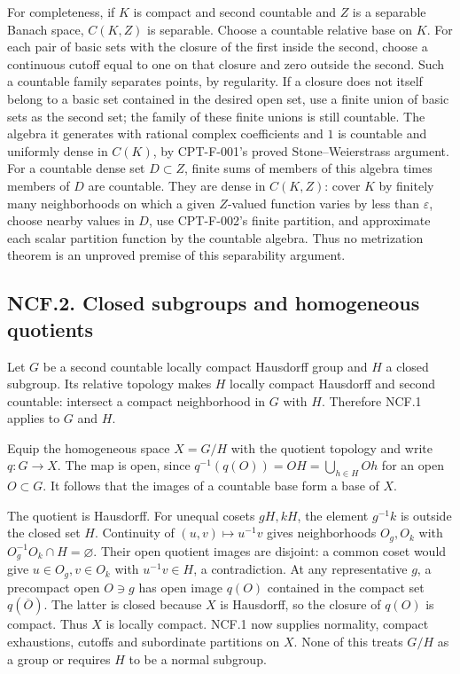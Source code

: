\documentclass[
  11pt,
]{article}
\begin{document}
For completeness, if \(K\) is compact and second countable and \(Z\) is
a separable Banach space, \(C(K,Z)\) is separable. Choose a countable
relative base on \(K\). For each pair of basic sets with the closure of
the first inside the second, choose a continuous cutoff equal to one on
that closure and zero outside the second. Such a countable family
separates points, by regularity. If a closure does not itself belong to
a basic set contained in the desired open set, use a finite union of
basic sets as the second set; the family of these finite unions is still
countable. The algebra it generates with rational complex coefficients
and \(1\) is countable and uniformly dense in \(C(K)\), by CPT-F-001's
proved Stone--Weierstrass argument. For a countable dense set
\(D\subset Z\), finite sums of members of this algebra times members of
\(D\) are countable. They are dense in \(C(K,Z)\): cover \(K\) by
finitely many neighborhoods on which a given \(Z\)-valued function
varies by less than \(\varepsilon\), choose nearby values in \(D\), use
CPT-F-002's finite partition, and approximate each scalar partition
function by the countable algebra. Thus no metrization theorem is an
unproved premise of this separability argument.

\subsection{NCF.2. Closed subgroups and homogeneous
quotients}\label{ncf.2.-closed-subgroups-and-homogeneous-quotients}

Let \(G\) be a second countable locally compact Hausdorff group and
\(H\) a closed subgroup. Its relative topology makes \(H\) locally
compact Hausdorff and second countable: intersect a compact neighborhood
in \(G\) with \(H\). Therefore NCF.1 applies to \(G\) and \(H\).

Equip the homogeneous space \(X=G/H\) with the quotient topology and
write \(q:G\to X\). The map is open, since
\(q^{-1}(q(O))=OH=\bigcup_{h\in H}Oh\) for an open \(O\subset G\). It
follows that the images of a countable base form a base of \(X\).

The quotient is Hausdorff. For unequal cosets \(gH,kH\), the element
\(g^{-1}k\) is outside the closed set \(H\). Continuity of
\((u,v)\mapsto u^{-1}v\) gives neighborhoods \(O_g,O_k\) with
\(O_g^{-1}O_k\cap H=\varnothing\). Their open quotient images are
disjoint: a common coset would give \(u\in O_g,v\in O_k\) with
\(u^{-1}v\in H\), a contradiction. At any representative \(g\), a
precompact open \(O\ni g\) has open image \(q(O)\) contained in the
compact set \(q(\overline O)\). The latter is closed because \(X\) is
Hausdorff, so the closure of \(q(O)\) is compact. Thus \(X\) is locally
compact. NCF.1 now supplies normality, compact exhaustions, cutoffs and
subordinate partitions on \(X\). None of this treats \(G/H\) as a group
or requires \(H\) to be a normal subgroup.
\end{document}

